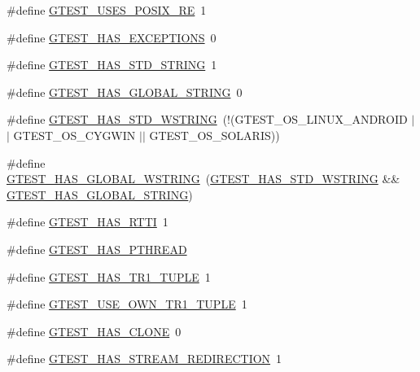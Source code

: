\begin{DoxyCompactItemize}
\item 
\#define \hyperlink{gtest-port_8h_acecef794eeb09598cd47da764271cb18}{G\+T\+E\+S\+T\+\_\+\+U\+S\+E\+S\+\_\+\+P\+O\+S\+I\+X\+\_\+\+R\+E}~1
\item 
\#define \hyperlink{gtest-port_8h_aedcf220690e6589d0fc2bd3db768ea66}{G\+T\+E\+S\+T\+\_\+\+H\+A\+S\+\_\+\+E\+X\+C\+E\+P\+T\+I\+O\+N\+S}~0
\item 
\#define \hyperlink{gtest-port_8h_adba1121430c11cee8ba0c74e8cf6aa40}{G\+T\+E\+S\+T\+\_\+\+H\+A\+S\+\_\+\+S\+T\+D\+\_\+\+S\+T\+R\+I\+N\+G}~1
\item 
\#define \hyperlink{gtest-port_8h_a6ab57c4a17233dd4ed30c2926bb99cc5}{G\+T\+E\+S\+T\+\_\+\+H\+A\+S\+\_\+\+G\+L\+O\+B\+A\+L\+\_\+\+S\+T\+R\+I\+N\+G}~0
\item 
\#define \hyperlink{gtest-port_8h_a6e087748d8bbd2ca57c487b6ad268670}{G\+T\+E\+S\+T\+\_\+\+H\+A\+S\+\_\+\+S\+T\+D\+\_\+\+W\+S\+T\+R\+I\+N\+G}~(!(G\+T\+E\+S\+T\+\_\+\+O\+S\+\_\+\+L\+I\+N\+U\+X\+\_\+\+A\+N\+D\+R\+O\+I\+D $\vert$$\vert$ G\+T\+E\+S\+T\+\_\+\+O\+S\+\_\+\+C\+Y\+G\+W\+I\+N $\vert$$\vert$ G\+T\+E\+S\+T\+\_\+\+O\+S\+\_\+\+S\+O\+L\+A\+R\+I\+S))
\item 
\#define \hyperlink{gtest-port_8h_afca9ecaf5846561187a15b75013aa85b}{G\+T\+E\+S\+T\+\_\+\+H\+A\+S\+\_\+\+G\+L\+O\+B\+A\+L\+\_\+\+W\+S\+T\+R\+I\+N\+G}~(\hyperlink{gtest-port_8h_a6e087748d8bbd2ca57c487b6ad268670}{G\+T\+E\+S\+T\+\_\+\+H\+A\+S\+\_\+\+S\+T\+D\+\_\+\+W\+S\+T\+R\+I\+N\+G} \&\& \hyperlink{gtest-port_8h_a6ab57c4a17233dd4ed30c2926bb99cc5}{G\+T\+E\+S\+T\+\_\+\+H\+A\+S\+\_\+\+G\+L\+O\+B\+A\+L\+\_\+\+S\+T\+R\+I\+N\+G})
\item 
\#define \hyperlink{gtest-port_8h_a9ba781217167f905bff2f1c410a97930}{G\+T\+E\+S\+T\+\_\+\+H\+A\+S\+\_\+\+R\+T\+T\+I}~1
\item 
\#define \hyperlink{gtest-port_8h_a3341397e1952de0b9cd88762d4d3ae4b}{G\+T\+E\+S\+T\+\_\+\+H\+A\+S\+\_\+\+P\+T\+H\+R\+E\+A\+D}
\item 
\#define \hyperlink{gtest-port_8h_a6de49dd4cbae1db15dc6edca3b179d1b}{G\+T\+E\+S\+T\+\_\+\+H\+A\+S\+\_\+\+T\+R1\+\_\+\+T\+U\+P\+L\+E}~1
\item 
\#define \hyperlink{gtest-port_8h_afa144e5f5d039db0df873e7ad48c1fda}{G\+T\+E\+S\+T\+\_\+\+U\+S\+E\+\_\+\+O\+W\+N\+\_\+\+T\+R1\+\_\+\+T\+U\+P\+L\+E}~1
\item 
\#define \hyperlink{gtest-port_8h_a40c075a7f969a694e59532356be59fd5}{G\+T\+E\+S\+T\+\_\+\+H\+A\+S\+\_\+\+C\+L\+O\+N\+E}~0
\item 
\#define \hyperlink{gtest-port_8h_add695166eb7b691f93777525d5881062}{G\+T\+E\+S\+T\+\_\+\+H\+A\+S\+\_\+\+S\+T\+R\+E\+A\+M\+\_\+\+R\+E\+D\+I\+R\+E\+C\+T\+I\+O\+N}~1

\end{DoxyCompactItemize}

